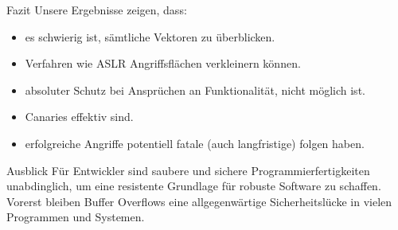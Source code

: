 \begin{frame}{Fazit}    
    Unsere Ergebnisse zeigen, dass:
    \vspace{1em}
    \begin{itemize}
        \item es schwierig ist, sämtliche Vektoren zu überblicken. 
        \item Verfahren wie ASLR Angriffsflächen verkleinern können.
        \item absoluter Schutz bei Ansprüchen an Funktionalität, nicht möglich ist.
        \item Canaries effektiv sind.
        \item erfolgreiche Angriffe potentiell fatale (auch langfristige) folgen haben. 
    \end{itemize}   
    

\end{frame}

\begin{frame}{Ausblick}
    Für Entwickler sind saubere und sichere Programmierfertigkeiten unabdinglich,
    um eine resistente Grundlage für robuste Software zu schaffen. 
    Vorerst bleiben Buffer Overflows eine allgegenwärtige Sicherheitslücke in vielen Programmen und Systemen.    
\end{frame}
